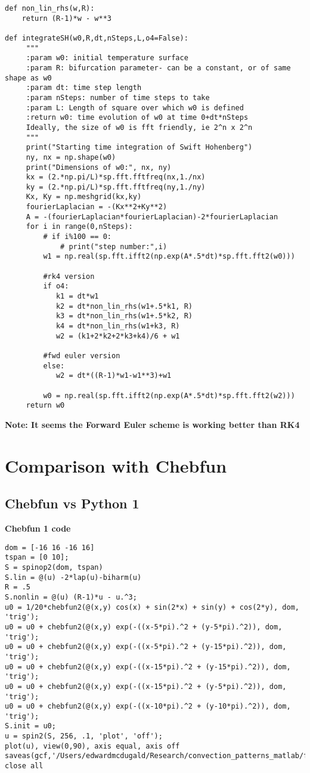 \documentclass[12pt]{article}
\begin{document}
\begin{verbatim}
def non_lin_rhs(w,R):
    return (R-1)*w - w**3

def integrateSH(w0,R,dt,nSteps,L,o4=False):
     """
     :param w0: initial temperature surface
     :param R: bifurcation parameter- can be a constant, or of same shape as w0
     :param dt: time step length
     :param nSteps: number of time steps to take
     :param L: Length of square over which w0 is defined
     :return w0: time evolution of w0 at time 0+dt*nSteps
     Ideally, the size of w0 is fft friendly, ie 2^n x 2^n
     """
     print("Starting time integration of Swift Hohenberg")
     ny, nx = np.shape(w0)
     print("Dimensions of w0:", nx, ny)
     kx = (2.*np.pi/L)*sp.fft.fftfreq(nx,1./nx)
     ky = (2.*np.pi/L)*sp.fft.fftfreq(ny,1./ny)
     Kx, Ky = np.meshgrid(kx,ky)
     fourierLaplacian = -(Kx**2+Ky**2)
     A = -(fourierLaplacian*fourierLaplacian)-2*fourierLaplacian
     for i in range(0,nSteps):
         # if i%100 == 0:
             # print("step number:",i)
         w1 = np.real(sp.fft.ifft2(np.exp(A*.5*dt)*sp.fft.fft2(w0)))

         #rk4 version
         if o4:
            k1 = dt*w1
            k2 = dt*non_lin_rhs(w1+.5*k1, R)
            k3 = dt*non_lin_rhs(w1+.5*k2, R)
            k4 = dt*non_lin_rhs(w1+k3, R)
            w2 = (k1+2*k2+2*k3+k4)/6 + w1

         #fwd euler version
         else:
            w2 = dt*((R-1)*w1-w1**3)+w1

         w0 = np.real(sp.fft.ifft2(np.exp(A*.5*dt)*sp.fft.fft2(w2)))
     return w0
\end{verbatim}

\textbf{Note: It seems the Forward Euler scheme is working better than RK4}

\section{Comparison with Chebfun}
\subsection{Chebfun vs Python 1}
\textbf{Chebfun 1 code}
\begin{verbatim}
dom = [-16 16 -16 16]
tspan = [0 10];
S = spinop2(dom, tspan)
S.lin = @(u) -2*lap(u)-biharm(u)
R = .5
S.nonlin = @(u) (R-1)*u - u.^3;
u0 = 1/20*chebfun2(@(x,y) cos(x) + sin(2*x) + sin(y) + cos(2*y), dom, 'trig');
u0 = u0 + chebfun2(@(x,y) exp(-((x-5*pi).^2 + (y-5*pi).^2)), dom, 'trig');
u0 = u0 + chebfun2(@(x,y) exp(-((x-5*pi).^2 + (y-15*pi).^2)), dom, 'trig');
u0 = u0 + chebfun2(@(x,y) exp(-((x-15*pi).^2 + (y-15*pi).^2)), dom, 'trig');
u0 = u0 + chebfun2(@(x,y) exp(-((x-15*pi).^2 + (y-5*pi).^2)), dom, 'trig');
u0 = u0 + chebfun2(@(x,y) exp(-((x-10*pi).^2 + (y-10*pi).^2)), dom, 'trig');
S.init = u0;
u = spin2(S, 256, .1, 'plot', 'off');
plot(u), view(0,90), axis equal, axis off
saveas(gcf,'/Users/edwardmcdugald/Research/convection_patterns_matlab/figs/sh_tsts_1018/cf1.pdf');
close all
\end{verbatim}
\end{document}

